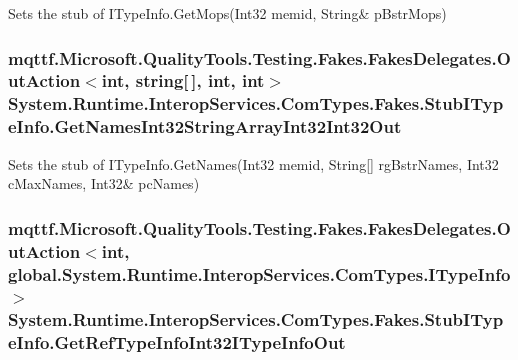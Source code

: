 Sets the stub of I\-Type\-Info.\-Get\-Mops(Int32 memid, String\& p\-Bstr\-Mops)

\hypertarget{class_system_1_1_runtime_1_1_interop_services_1_1_com_types_1_1_fakes_1_1_stub_i_type_info_ac4c8f60e03e69210bb27eb992bd23d13}{
\subsubsection[{Get\-Names\-Int32\-String\-Array\-Int32\-Int32\-Out}]{\setlength{\rightskip}{0pt plus 5cm}mqttf.\-Microsoft.\-Quality\-Tools.\-Testing.\-Fakes.\-Fakes\-Delegates.\-Out\-Action$<$int, string\mbox{[}$\,$\mbox{]}, int, int$>$ System.\-Runtime.\-Interop\-Services.\-Com\-Types.\-Fakes.\-Stub\-I\-Type\-Info.\-Get\-Names\-Int32\-String\-Array\-Int32\-Int32\-Out}}\label{class_system_1_1_runtime_1_1_interop_services_1_1_com_types_1_1_fakes_1_1_stub_i_type_info_ac4c8f60e03e69210bb27eb992bd23d13}


Sets the stub of I\-Type\-Info.\-Get\-Names(Int32 memid, String\mbox{[}\mbox{]} rg\-Bstr\-Names, Int32 c\-Max\-Names, Int32\& pc\-Names)

\hypertarget{class_system_1_1_runtime_1_1_interop_services_1_1_com_types_1_1_fakes_1_1_stub_i_type_info_ab61fd1c516dc7773f06e3f3528cfcbc5}{
\subsubsection[{Get\-Ref\-Type\-Info\-Int32\-I\-Type\-Info\-Out}]{\setlength{\rightskip}{0pt plus 5cm}mqttf.\-Microsoft.\-Quality\-Tools.\-Testing.\-Fakes.\-Fakes\-Delegates.\-Out\-Action$<$int, global.\-System.\-Runtime.\-Interop\-Services.\-Com\-Types.\-I\-Type\-Info$>$ System.\-Runtime.\-Interop\-Services.\-Com\-Types.\-Fakes.\-Stub\-I\-Type\-Info.\-Get\-Ref\-Type\-Info\-Int32\-I\-Type\-Info\-Out}}\label{class_system_1_1_runtime_1_1_interop_services_1_1_com_types_1_1_fakes_1_1_stub_i_type_info_ab61fd1c516dc7773f06e3f3528cfcbc5}


